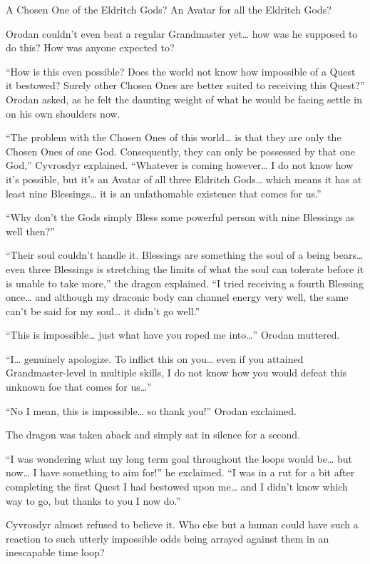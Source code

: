 \documentclass[a4paper,10pt]{book}
\begin{document}
A Chosen One of the Eldritch Gods? An Avatar for all the Eldritch Gods?\par
Orodan couldn’t even beat a regular Grandmaster yet… how was he supposed to do this? How was anyone expected to?\par
“How is this even possible? Does the world not know how impossible of a Quest it bestowed? Surely other Chosen Ones are better suited to receiving this Quest?” Orodan asked, as he felt the daunting weight of what he would be facing settle in on his own shoulders now.\par
“The problem with the Chosen Ones of this world… is that they are only the Chosen Ones of one God. Consequently, they can only be possessed by that one God,” Cyvrosdyr explained. “Whatever is coming however… I do not know how it’s possible, but it’s an Avatar of all three Eldritch Gods… which means it has at least nine Blessings… it is an unfathomable existence that comes for us.”\par
“Why don’t the Gods simply Bless some powerful person with nine Blessings as well then?”\par
“Their soul couldn’t handle it. Blessings are something the soul of a being bears… even three Blessings is stretching the limits of what the soul can tolerate before it is unable to take more,” the dragon explained. “I tried receiving a fourth Blessing once… and although my draconic body can channel energy very well, the same can’t be said for my soul… it didn’t go well.”\par
“This is impossible… just what have you roped me into…” Orodan muttered.\par
“I… genuinely apologize. To inflict this on you… even if you attained Grandmaster-level in multiple skills, I do not know how you would defeat this unknown foe that comes for us…”\par
“No I mean, this is impossible… so thank you!” Orodan exclaimed.\par
The dragon was taken aback and simply sat in silence for a second.\par
“I was wondering what my long term goal throughout the loops would be… but now… I have something to aim for!” he exclaimed. “I was in a rut for a bit after completing the first Quest I had bestowed upon me… and I didn’t know which way to go, but thanks to you I now do.”\par
Cyvrosdyr almost refused to believe it. Who else but a human could have such a reaction to such utterly impossible odds being arrayed against them in an inescapable time loop?\par
\end{document}

